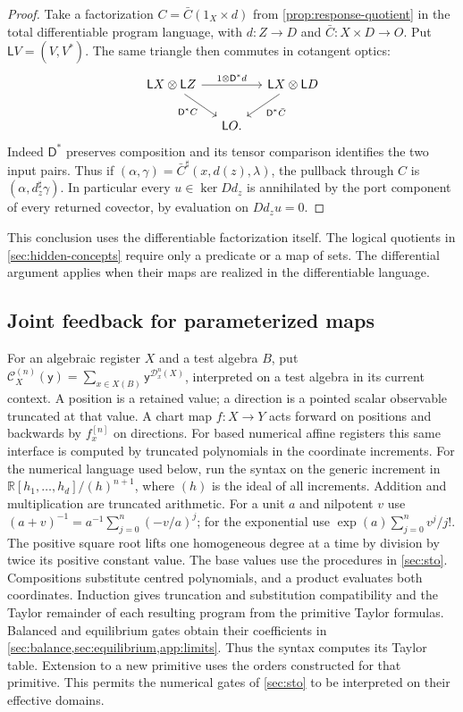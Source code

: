 \documentclass[11pt,a4paper]{article}
\theoremstyle{definition}
\theoremstyle{remark}\newaliascnt{remark}{theorem}
\newcommand{\R}{\mathbb R}
\numberwithin{equation}{section}
\begin{document}
\begin{proof}
Take a factorization \(C=\bar C(1_X\times d)\) from \cref{prop:response-quotient} in the total differentiable program language, with \(d:Z\to D\) and \(\bar C:X\times D\to O\). Put \(\mathsf L V=(V,V^*)\). The same triangle then commutes in cotangent optics:
\[
\begin{tikzcd}[column sep=small]
 \mathsf L X\otimes\mathsf L Z\arrow[rr,"{1\otimes\mathsf D^*d}"]\arrow[dr,"\mathsf D^*C"']&&
 \mathsf L X\otimes\mathsf L D\arrow[dl,"{\mathsf D^*\bar C}"]\\
 &\mathsf L O .
\end{tikzcd}
\]
Indeed \(\mathsf D^*\) preserves composition and its tensor comparison identifies the two input pairs. Thus if \((\alpha,\gamma)=\bar C^\sharp(x,d(z),\lambda)\), the pullback through \(C\) is \((\alpha,d_z^\sharp\gamma)\). In particular every \(u\in\ker Dd_z\) is annihilated by the port component of every returned covector, by evaluation on \(Dd_z u=0\).
\end{proof}
This conclusion uses the differentiable factorization itself. The logical quotients in \cref{sec:hidden-concepts} require only a predicate or a map of sets. The differential argument applies when their maps are realized in the differentiable language.

\subsection{Joint feedback for parameterized maps}\label{sec:joint-feedback}
For an algebraic register $X$ and a test algebra $B$, put
$\mathcal C_X^{(n)}(\mathsf y)=\sum_{x\in X(B)}\mathsf y^{\mathcal D_x^n(X)}$,
interpreted on a test algebra in its current context. A position is a retained value; a direction is a pointed scalar observable truncated at that value. A chart map $f:X\to Y$ acts forward on positions and backwards by $f_x^{[n]}$ on directions. For based numerical affine registers this same interface is computed by truncated polynomials in the coordinate increments. For the numerical language used below, run the syntax on the generic increment in $\R[h_1,\ldots,h_d]/(h)^{n+1}$, where $(h)$ is the ideal of all increments. Addition and multiplication are truncated arithmetic. For a unit $a$ and nilpotent $v$ use $(a+v)^{-1}=a^{-1}\sum_{j=0}^n(-v/a)^j$; for the exponential use $\exp(a)\sum_{j=0}^n v^j/j!$. The positive square root lifts one homogeneous degree at a time by division by twice its positive constant value. The base values use the procedures in \cref{sec:sto}. Compositions substitute centred polynomials, and a product evaluates both coordinates. Induction gives truncation and substitution compatibility and the Taylor remainder of each resulting program from the primitive Taylor formulas. Balanced and equilibrium gates obtain their coefficients in \cref{sec:balance,sec:equilibrium,app:limits}. Thus the syntax computes its Taylor table. Extension to a new primitive uses the orders constructed for that primitive. This permits the numerical gates of \cref{sec:sto} to be interpreted on their effective domains.
\end{document}
